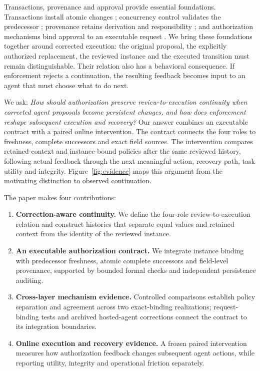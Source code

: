 \documentclass[10pt,a4paper,twocolumn]{article}
\begin{document}
Transactions, provenance and approval provide essential foundations. Transactions install atomic changes \citep{gray1981transaction}; concurrency control validates the predecessor \citep{kung1981occ}; provenance retains derivation and responsibility \citep{buneman2006curated,moreau2013provdm}; and authorization mechanisms bind approval to an executable request \citep{clark1987integrity,owaspTransactionAuthorization}. We bring these foundations together around corrected execution: the original proposal, the explicitly authorized replacement, the reviewed instance and the executed transition must remain distinguishable. Their relation also has a behavioral consequence. If enforcement rejects a continuation, the resulting feedback becomes input to an agent that must choose what to do next.

We ask: \emph{How should authorization preserve review-to-execution continuity when corrected agent proposals become persistent changes, and how does enforcement reshape subsequent execution and recovery?} Our answer combines an executable contract with a paired online intervention. The contract connects the four roles to freshness, complete successors and exact field sources. The intervention compares retained-context and instance-bound policies after the same reviewed history, following actual feedback through the next meaningful action, recovery path, task utility and integrity. Figure~\ref{fig:evidence} maps this argument from the motivating distinction to observed continuation.

The paper makes four contributions:
\begin{enumerate}[leftmargin=*,itemsep=2pt]
\item \textbf{Correction-aware continuity.} We define the four-role review-to-execution relation and construct histories that separate equal values and retained context from the identity of the reviewed instance.
\item \textbf{An executable authorization contract.} We integrate instance binding with predecessor freshness, atomic complete successors and field-level provenance, supported by bounded formal checks and independent persistence auditing.
\item \textbf{Cross-layer mechanism evidence.} Controlled comparisons establish policy separation and agreement across two exact-binding realizations; request-binding tests and archived hosted-agent corrections connect the contract to its integration boundaries.
\item \textbf{Online execution and recovery evidence.} A frozen paired intervention measures how authorization feedback changes subsequent agent actions, while reporting utility, integrity and operational friction separately.
\end{enumerate}
\end{document}
